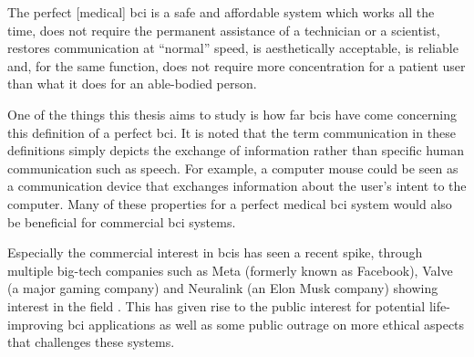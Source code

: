 \setlength{\epigraphwidth}{0.9\textwidth}
\epigraph{The perfect [medical] \gls{bci} is a safe and affordable system which works all the time, does not require the permanent assistance of a technician or a scientist, restores communication at “normal” speed, is aesthetically acceptable, is reliable and, for the same function, does not require more concentration for a patient user than what it does for an able-bodied person.}{\textit{\citet{bci_book, cheap_bci_feasibility}}}


One of the things this thesis aims to study is how far \glspl{bci} have come concerning this definition of a perfect \gls{bci}.
It is noted that the term communication in these definitions simply depicts the exchange of information rather than specific human communication such as speech. For example, a computer mouse could be seen as a communication device that exchanges information about the user's intent to the computer.
Many of these properties for a perfect medical \gls{bci} system would also be beneficial for commercial \gls{bci} systems.

Especially the commercial interest in \glspl{bci} has seen a recent spike, through multiple big-tech companies such as Meta (formerly known as Facebook), Valve (a major gaming company) and Neuralink (an Elon Musk company) showing interest in the field \citep{facebook_bci_blog, bci_valve, neuralink_whitepaper}.
This has given rise to the public interest for potential life-improving \gls{bci} applications as well as some public outrage on more ethical aspects that challenges these systems. 

